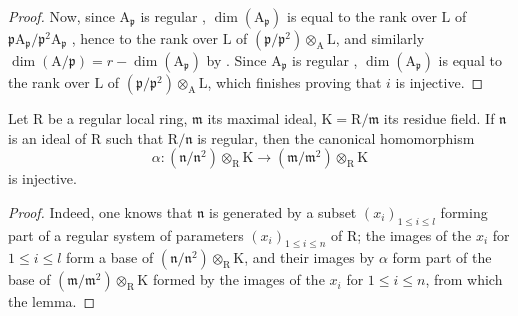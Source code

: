 \begin{proof}
Now, since $\mathrm{A}_\mathfrak{p}$ is regular , $\dim(\mathrm{A}_\mathfrak{p})$ is equal to the rank over $\mathrm{L}$ of $\mathfrak{p}\mathrm{A}_\mathfrak{p}/\mathfrak{p}^2\mathrm{A}_\mathfrak{p}$ , hence to the rank over $\mathrm{L}$ of $(\mathfrak{p}/\mathfrak{p}^2)\otimes_\mathrm{A}\mathrm{L}$, and similarly $\dim(\mathrm{A}/\mathfrak{p})=r-\dim(\mathrm{A}_\mathfrak{p})$ by .
Since $\mathrm{A}_\mathfrak{p}$ is regular , $\dim(\mathrm{A}_\mathfrak{p})$ is equal to the rank over $\mathrm{L}$ of $(\mathfrak{p}/\mathfrak{p}^2)\otimes_\mathrm{A}\mathrm{L}$, which finishes proving that $i$ is injective.
\end{proof}

\begin{lemma}[22.7.2.4]
\label{0.22.7.2.4}
Let $\mathrm{R}$ be a regular local ring, $\mathfrak{m}$ its maximal ideal, $\mathrm{K}=\mathrm{R}/\mathfrak{m}$ its residue field.
If $\mathfrak{n}$ is an ideal of $\mathrm{R}$ such that $\mathrm{R}/\mathfrak{n}$ is regular, then the canonical homomorphism
\[
\label{0.22.7.2.5}
  \alpha:(\mathfrak{n}/\mathfrak{n}^2)\otimes_\mathrm{R}\mathrm{K}\to(\mathfrak{m}/\mathfrak{m}^2)\otimes_\mathrm{R}\mathrm{K}
  \tag{22.7.2.5}
\]
is injective.
\end{lemma}

\begin{proof}
Indeed, one knows  that $\mathfrak{n}$ is generated by a subset $(x_i)_{1\leq i\leq l}$ forming part of a regular system of parameters $(x_i)_{1\leq i\leq n}$ of $\mathrm{R}$; the images of the $x_i$ for $1\leq i\leq l$ form a base of $(\mathfrak{n}/\mathfrak{n}^2)\otimes_\mathrm{R}\mathrm{K}$, and their images by $\alpha$ form part of the base of $(\mathfrak{m}/\mathfrak{m}^2)\otimes_\mathrm{R}\mathrm{K}$ formed by the images of the $x_i$ for $1\leq i\leq n$, from which the lemma.
\end{proof}

